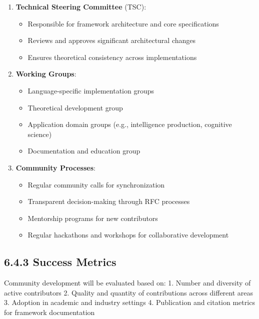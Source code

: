 \documentclass[
  11pt,
  letterpaper,
]{article}
\providecommand{\tightlist}{%
  \setlength{\itemsep}{0pt}\setlength{\parskip}{0pt}}
\begin{document}
\begin{enumerate}
\def\labelenumi{\arabic{enumi}.}
\tightlist
\item
  \textbf{Technical Steering Committee} (TSC):

  \begin{itemize}
  \tightlist
  \item
    Responsible for framework architecture and core specifications
  \item
    Reviews and approves significant architectural changes
  \item
    Ensures theoretical consistency across implementations
  \end{itemize}
\item
  \textbf{Working Groups}:

  \begin{itemize}
  \tightlist
  \item
    Language-specific implementation groups
  \item
    Theoretical development group
  \item
    Application domain groups (e.g., intelligence production, cognitive
    science)
  \item
    Documentation and education group
  \end{itemize}
\item
  \textbf{Community Processes}:

  \begin{itemize}
  \tightlist
  \item
    Regular community calls for synchronization
  \item
    Transparent decision-making through RFC processes
  \item
    Mentorship programs for new contributors
  \item
    Regular hackathons and workshops for collaborative development
  \end{itemize}
\end{enumerate}

\hypertarget{success-metrics}{%
\subsection{6.4.3 Success Metrics}\label{success-metrics}}

Community development will be evaluated based on: 1. Number and
diversity of active contributors 2. Quality and quantity of
contributions across different areas 3. Adoption in academic and
industry settings 4. Publication and citation metrics for framework
documentation
\end{document}
